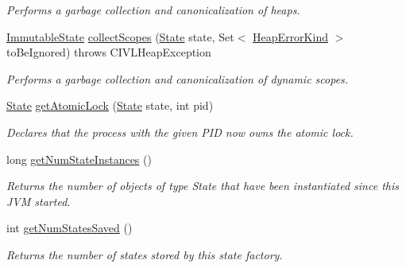 \begin{DoxyCompactItemize}
\begin{DoxyCompactList}\small\item\em Performs a garbage collection and canonicalization of heaps. \end{DoxyCompactList}\item 
\hyperlink{classedu_1_1udel_1_1cis_1_1vsl_1_1civl_1_1state_1_1common_1_1immutable_1_1ImmutableState}{Immutable\+State} \hyperlink{classedu_1_1udel_1_1cis_1_1vsl_1_1civl_1_1state_1_1common_1_1immutable_1_1ImmutableStateFactory_ac08af796a3dfdb6f0cce6c0c1afb8c68}{collect\+Scopes} (\hyperlink{interfaceedu_1_1udel_1_1cis_1_1vsl_1_1civl_1_1state_1_1IF_1_1State}{State} state, Set$<$ \hyperlink{enumedu_1_1udel_1_1cis_1_1vsl_1_1civl_1_1state_1_1IF_1_1CIVLHeapException_1_1HeapErrorKind}{Heap\+Error\+Kind} $>$ to\+Be\+Ignored)  throws C\+I\+V\+L\+Heap\+Exception 
\begin{DoxyCompactList}\small\item\em Performs a garbage collection and canonicalization of dynamic scopes. \end{DoxyCompactList}\item 
\hyperlink{interfaceedu_1_1udel_1_1cis_1_1vsl_1_1civl_1_1state_1_1IF_1_1State}{State} \hyperlink{classedu_1_1udel_1_1cis_1_1vsl_1_1civl_1_1state_1_1common_1_1immutable_1_1ImmutableStateFactory_a912ed0ca7a4414f2edc2be8e36faefde}{get\+Atomic\+Lock} (\hyperlink{interfaceedu_1_1udel_1_1cis_1_1vsl_1_1civl_1_1state_1_1IF_1_1State}{State} state, int pid)
\begin{DoxyCompactList}\small\item\em Declares that the process with the given P\+I\+D now owns the atomic lock. \end{DoxyCompactList}\item 
long \hyperlink{classedu_1_1udel_1_1cis_1_1vsl_1_1civl_1_1state_1_1common_1_1immutable_1_1ImmutableStateFactory_a0a89d58bd62a499947f0afac037379dd}{get\+Num\+State\+Instances} ()
\begin{DoxyCompactList}\small\item\em Returns the number of objects of type State that have been instantiated since this J\+V\+M started. \end{DoxyCompactList}\item 
int \hyperlink{classedu_1_1udel_1_1cis_1_1vsl_1_1civl_1_1state_1_1common_1_1immutable_1_1ImmutableStateFactory_acd0074abb7544acdde596a2fab96e669}{get\+Num\+States\+Saved} ()
\begin{DoxyCompactList}\small\item\em Returns the number of states stored by this state factory. \end{DoxyCompactList}\item 

\end{DoxyCompactItemize}
